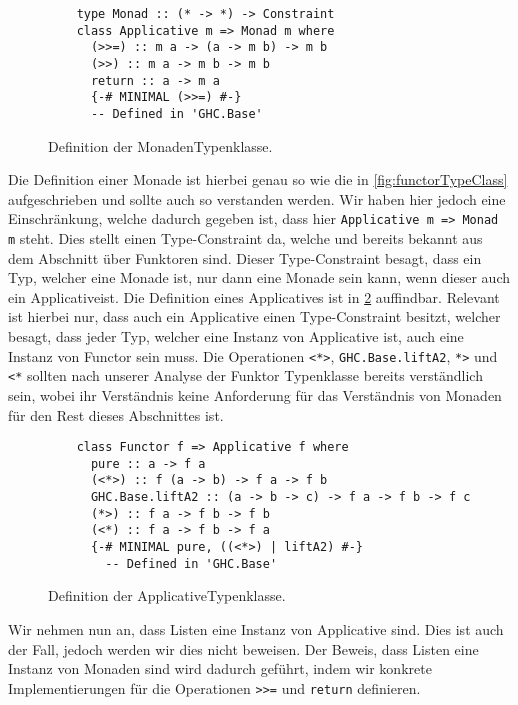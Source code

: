 \documentclass{hhuarticle}
\theoremstyle{definition}
\theoremstyle{theorem}
\begin{document}
  \begin{figure}[h]
    \begin{verbatim}
    type Monad :: (* -> *) -> Constraint
    class Applicative m => Monad m where
      (>>=) :: m a -> (a -> m b) -> m b
      (>>) :: m a -> m b -> m b
      return :: a -> m a
      {-# MINIMAL (>>=) #-}
      -- Defined in 'GHC.Base'
    \end{verbatim}
    \caption{Definition der \glqq Monaden\grqq  Typenklasse.}%
    \label{fig:MonadeDef}
  \end{figure}

  Die Definition einer Monade ist hierbei genau so wie die in
  \cref{fig:functorTypeClass} aufgeschrieben und sollte auch so
  verstanden werden. Wir haben hier jedoch eine Einschränkung,
  welche dadurch gegeben ist, dass hier \verb|Applicative m => Monad m|
  steht. Dies stellt einen Type-Constraint da, welche
  und bereits bekannt aus dem Abschnitt über Funktoren sind.
  Dieser Type-Constraint besagt, dass ein Typ, welcher eine Monade
  ist, nur dann eine Monade sein kann, wenn dieser auch ein \glqq Applicative\grqq  ist.
  Die Definition eines Applicatives ist in \cref{fig:ApplicativeDef}
  auffindbar. Relevant ist hierbei nur, dass auch ein Applicative einen
  Type-Constraint besitzt, welcher besagt, dass jeder Typ, welcher
  eine Instanz von Applicative ist, auch eine Instanz von Functor
  sein muss. Die Operationen \verb|<*>|, \verb|GHC.Base.liftA2|,  \verb|*>| 
  und \verb|<*| sollten nach unserer Analyse der Funktor Typenklasse bereits
  verständlich sein, wobei ihr Verständnis keine Anforderung
  für das Verständnis von Monaden für den Rest dieses Abschnittes ist.

  \begin{figure}[h]
    \begin{verbatim}
    class Functor f => Applicative f where
      pure :: a -> f a
      (<*>) :: f (a -> b) -> f a -> f b
      GHC.Base.liftA2 :: (a -> b -> c) -> f a -> f b -> f c
      (*>) :: f a -> f b -> f b
      (<*) :: f a -> f b -> f a
      {-# MINIMAL pure, ((<*>) | liftA2) #-}
        -- Defined in 'GHC.Base'
    \end{verbatim}
    \caption{Definition der \glqq Applicative\grqq  Typenklasse.}%
    \label{fig:ApplicativeDef}
  \end{figure}

  Wir nehmen nun an, dass Listen eine Instanz von Applicative sind.
  Dies ist auch der Fall, jedoch werden wir dies nicht beweisen. Der
  Beweis, dass Listen eine Instanz von Monaden sind wird dadurch geführt,
  indem wir konkrete Implementierungen für die Operationen
  \verb|>>=| und \verb|return| definieren.
\end{document}
